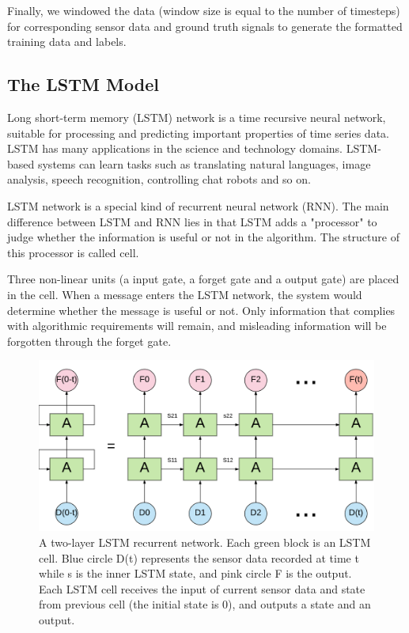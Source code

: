 \documentclass[11pt]{article}
\begin{document}
{Finally, we windowed the data (window size is equal to the number of timesteps) for corresponding sensor data and ground truth signals to generate the formatted training data and labels.


\subsection{The LSTM Model}
Long short-term memory (LSTM) network is a time recursive neural network, suitable for processing and predicting important properties of time series data. LSTM has many applications in the science and technology domains. LSTM-based systems can learn tasks such as translating natural languages, image analysis, speech recognition, controlling chat robots and so on.

LSTM network is a special kind of recurrent neural network (RNN). The main difference between LSTM and RNN lies in that LSTM adds a "processor" to judge whether the information is useful or not in the algorithm. The structure of this processor is called cell.

Three non-linear units (a input gate, a forget gate and a output gate) are placed in the cell. When a message enters the LSTM network, the system would determine whether the message is useful or not. Only information that complies with algorithmic requirements will remain, and misleading information will be forgotten through the forget gate.


\begin{figure}[ht]
\centering
\includegraphics[scale=0.3]{LSTM3}
\caption{A two-layer LSTM recurrent network. Each green block is an LSTM cell. Blue circle D(t) represents the sensor data recorded at time t while s is the inner LSTM state, and pink circle F is the output. Each LSTM cell receives the input of current sensor data and state from previous cell (the initial state is 0), and outputs a state and an output.}
\label{fig:LSTM}
\end{figure}

}
\end{document}
